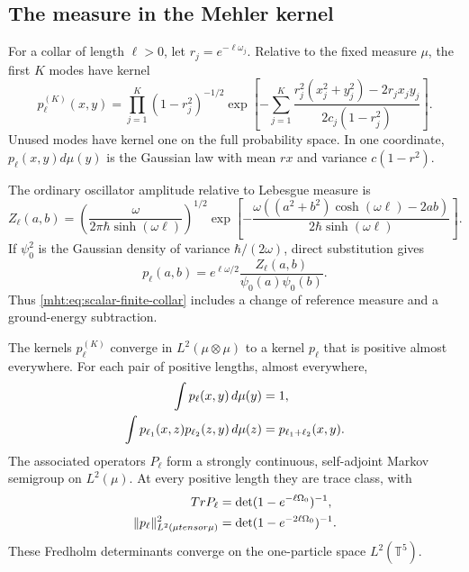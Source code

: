 \subsection{The measure in the Mehler kernel}

For a collar of length $\ell>0$, let $r_j=e^{-\ell\omega_j}$.
Relative to the fixed measure $\mu$, the first $K$ modes have
kernel
\begin{equation}\label{mht:eq:scalar-finite-collar}
 p_\ell^{(K)}(x,y)=\prod_{j=1}^K(1-r_j^2)^{-1/2}
 \exp\!\left[-\sum_{j=1}^K
  \frac{r_j^2(x_j^2+y_j^2)-2r_jx_jy_j}
                              {2c_j(1-r_j^2)}\right].
\end{equation}
Unused modes have kernel one on the full probability space.
In one coordinate, $p_\ell(x,y)d\mu(y)$ is the Gaussian law
with mean $rx$ and variance $c(1-r^2)$.

The ordinary oscillator amplitude relative to Lebesgue measure is
\begin{equation}\label{mht:eq:scalar-oscillator-amplitude}
 Z_\ell(a,b)=
 \left(\frac{\omega}{2\pi\hbar\sinh(\omega\ell)}\right)^{1/2}
 \exp\!\left[-\frac{\omega((a^2+b^2)\cosh(\omega\ell)-2ab)}
                                  {2\hbar\sinh(\omega\ell)}\right].
\end{equation}
If $\psi_0^2$ is the Gaussian density of variance
$\hbar/(2\omega)$, direct substitution gives
\begin{equation}\label{mht:eq:scalar-ground-transform}
 p_\ell(a,b)=e^{\ell\omega/2}
                  \frac{Z_\ell(a,b)}{\psi_0(a)\psi_0(b)}.
\end{equation}
Thus \eqref{mht:eq:scalar-finite-collar} includes a change of
reference measure and a ground-energy subtraction.

\begin{theorem}\label{mht:thm:scalar-infinite-sewing}
The kernels $p_\ell^{(K)}$ converge in $L^2(\mu\otimes\mu)$
to a kernel $p_\ell$ that is positive almost everywhere.
For each pair of positive lengths, almost everywhere,
\begin{align}
 \int p_\ell(x,y)\,d\mu(y)&=1,\notag\\
 \int p_{\ell_1}(x,z)p_{\ell_2}(z,y)\,d\mu(z)
                         &=p_{\ell_1+\ell_2}(x,y).
       \label{mht:eq:scalar-infinite-sewing}
\end{align}
The associated operators $P_\ell$ form a strongly continuous,
self-adjoint Markov semigroup on $L^2(\mu)$.
At every positive length they are trace class, with
\begin{align}
 \operatorname{Tr}P_\ell
       &=\det(1-e^{-\ell\Omega_0})^{-1},\notag\\
 \|p_\ell\|_{L^2(\mu\otimes\mu)}^2
       &=\det(1-e^{-2\ell\Omega_0})^{-1}.
       \label{mht:eq:scalar-fredholm-determinants}
\end{align}
These Fredholm determinants converge on the one-particle
space $L^2(\mathbb T^5)$.
\end{theorem}

